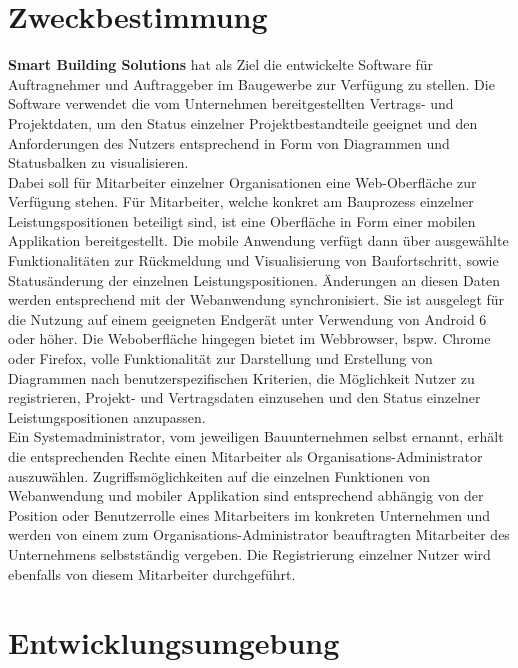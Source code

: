 {\section{Zweckbestimmung}\label{sec:zweckbestimmung}
\textbf{Smart Building Solutions} hat als Ziel die entwickelte Software f\"ur Auftragnehmer und Auftraggeber im Baugewerbe zur Verf\"ugung zu stellen.  Die Software verwendet die vom Unternehmen bereitgestellten Vertrags- und Projektdaten,  um den Status einzelner Projektbestandteile geeignet und den Anforderungen des Nutzers entsprechend in Form von Diagrammen und Statusbalken zu visualisieren. \\
Dabei soll f\"ur Mitarbeiter einzelner Organisationen eine Web-Oberfl\"ache zur Verf\"ugung stehen.  F\"ur  Mitarbeiter,  welche konkret am Bauprozess einzelner Leistungspositionen beteiligt sind,  ist eine Oberfl\"ache in Form einer mobilen Applikation bereitgestellt.  Die mobile Anwendung verf\"ugt dann \"uber ausgew\"ahlte Funktionalit\"aten zur R\"uckmeldung und Visualisierung von Baufortschritt,  sowie Status\"anderung der einzelnen Leistungspositionen.  \"Anderungen an diesen Daten werden entsprechend mit der Webanwendung synchronisiert.  Sie ist ausgelegt f\"ur die Nutzung auf einem geeigneten Endger\"at unter Verwendung von Android 6 oder h\"oher.  Die Weboberfl\"ache hingegen bietet im Webbrowser,  bspw. Chrome oder Firefox, volle Funktionalit\"at zur Darstellung und Erstellung von Diagrammen nach benutzerspezifischen Kriterien, die M\"oglichkeit Nutzer zu registrieren,  Projekt- und Vertragsdaten einzusehen und den Status einzelner Leistungspositionen anzupassen. \\
Ein Systemadministrator, vom jeweiligen Bauunternehmen selbst ernannt,  erh\"alt die entsprechenden Rechte  einen Mitarbeiter als Organisations-Administrator auszuw\"ahlen.
Zugriffsm\"oglichkeiten auf die einzelnen Funktionen von Webanwendung und mobiler Applikation sind entsprechend abh\"angig von der Position oder Benutzerrolle eines Mitarbeiters im konkreten Unternehmen und werden von einem zum Organisations-Administrator beauftragten Mitarbeiter des Unternehmens selbstst\"andig vergeben.  Die Registrierung einzelner Nutzer wird ebenfalls von diesem Mitarbeiter durchgef\"uhrt.

\newpage
\section{Entwicklungsumgebung}\label{sec:entwicklungsumgebung}

}
